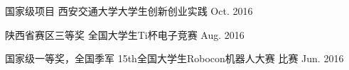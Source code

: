 
\begin{cvhonors}


  \cvhonor
    {国家级项目} %
    {西安交通大学大学生创新创业实践} %
    {} %
    {Oct. 2016} %
 
  \cvhonor
    {陕西省赛区三等奖} %
    {全国大学生Ti杯电子竞赛} %
    {} %
    {Aug. 2016} %

  \cvhonor
    {国家级一等奖，全国季军} %
    { 15th全国大学生Robocon机器人大赛 比赛} %
    {} %
    {Jun. 2016} %

\end{cvhonors}
